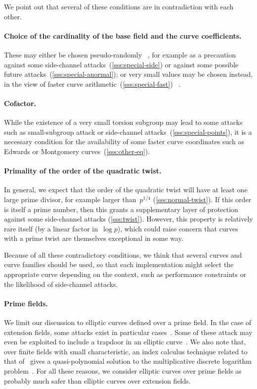 \documentclass[twocolumn,letterpaper]{article}
\begin{document}
\bigbreak

We point out that several of these conditions are in contradiction
with each other.

\paragraph{Choice of the cardinality of the base field
and the curve coefficients.}
These may either be chosen pseudo-randomly~%
\cite{rfc5639,jorf2011ce}, for example
as a precaution against some side-channel attacks~(\ref{sss:special-side})
or against some possible future attacks~(\ref{sss:special-anormal});
or very small values may be chosen instead,
in the view of faster curve arithmetic~(\ref{sss:special-fast})~%
\cite{nist2000fips186-2,pkc2006bernstein,oscca2010sm2}.

\paragraph{Cofactor.}
While the existence of a very small torsion subgroup
may lead to some attacks such as
small-subgroup attack or side-channel attacks~(\ref{sss:special-points}),
it is a necessary condition for the availability
of some faster curve coordinates
such as Edwards or Montgomery curves~(\ref{sss:other-eq}).

\paragraph{Primality of the order of the quadratic twist.}
In general, we expect that the order of the quadratic twist
will have at least one large prime divisor,
for example larger than~$p^{1/4}$ (\ref{sss:normal-twist}).
If this order is itself a prime number,
then this grants a supplementary layer of protection
against some side-channel attacks (\ref{sss:twist}).
However, this property is relatively rare itself
(by a linear factor in~$\log p$),
which could raise concern that
curves with a prime twist are themselves exceptional in some way.

Because of all these contradictory conditions,
we think that several curves and curve families should be used,
so that each implementation might select the appropriate curve
depending on the context,
such as performance constraints or the likelihood of side-channel attacks.

\paragraph{Prime fields.}%
We limit our discussion to elliptic curves defined over a prime field.
In the case of extension fields,
some attacks exist in particular
cases~\cite{jc2013jv,rsa2004mtw,asia1999dgm,jc2002ghs}.
Some of these attack may even be exploited
to include a trapdoor in an elliptic curve~\cite{jc2006teske}.
We also note that, over finite fields with small characteristic,
an index calculus technique related to that of~\cite{jc2013jv}
gives a quasi-polynomial solution to
the multiplicative discrete logarithm problem~\cite{euro2014bgjt}.
For all these reasons, we consider elliptic curves over prime fields
as probably much safer than elliptic curves over extension fields.
\end{document}
